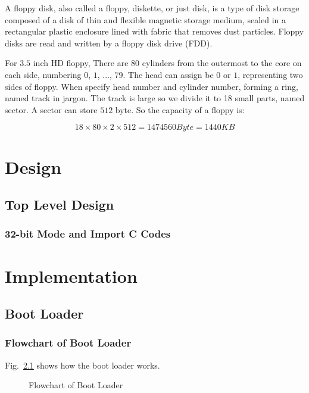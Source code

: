 \documentclass{swfcthesis}
\begin{document}
A floppy disk, also called a floppy, diskette, or just disk, is a type of disk storage
composed of a disk of thin and flexible magnetic storage medium, sealed in a rectangular
plastic enclosure lined with fabric that removes dust particles. Floppy disks are read and
written by a floppy disk drive (FDD).

For $3.5$ inch HD floppy,  There are $80$ cylinders from the outermost to
the core on each side, numbering $0$, $1$, ..., $79$. The head can assign be $0$ or $1$,
representing two sides of floppy. When specify head number and cylinder number, forming a
ring, named track in jargon. The track is large so we divide it to 18 small parts, named
sector. A sector can store $512$ byte. So the capacity of a floppy is:

$$18 \times 80 \times 2 \times 512 = 1474560 Byte = 1440 KB$$


\chapter{Design}

\section{Top Level Design}
\label{sec:top-level-design}


\subsection{32-bit Mode and Import C Codes}
\label{sec:32-bit-mode}


\chapter{Implementation}

\section{Boot Loader}

\subsection{Flowchart of Boot Loader}
\label{sec:flowch-boot-load}

Fig.~\ref{fig:flowchart-of-boot-loader} shows how the boot loader works.
\begin{figure}[!ht]
  \centering
  \caption{Flowchart of Boot Loader}
  \label{fig:flowchart-of-boot-loader}
\end{figure}
\end{document}

